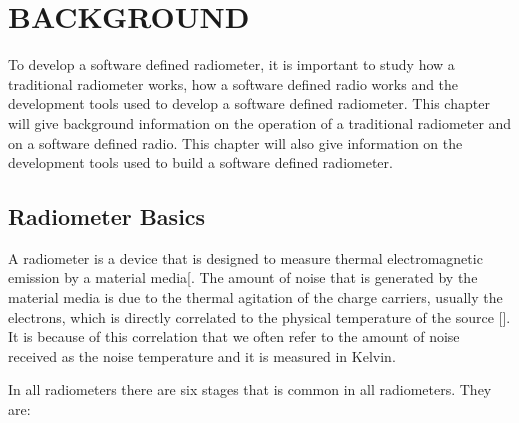 

\chapter{BACKGROUND}\label{ch:background}

To develop a software defined radiometer, it is important to study how a traditional radiometer works, how a software defined radio works and the development tools used to develop a software defined radiometer.  This chapter will give background information on the operation of a traditional radiometer and on a software defined radio.  This chapter will also give information on the development tools used to build a software defined radiometer.  


\section{Radiometer Basics}\label{rad_basics}
A radiometer is a device that is designed to measure thermal electromagnetic emission by a material media[\cite{ulaby}.  The amount of noise that is generated by the material media is due to the thermal agitation of the charge carriers, usually the electrons, which is directly correlated to the physical temperature of the source [\cite{Nyquist1928thermal}].  It is because of this correlation that we often refer to the amount of noise received as the noise temperature and it is measured in Kelvin. 

In all radiometers there are six stages that is common in all radiometers.  They are:

